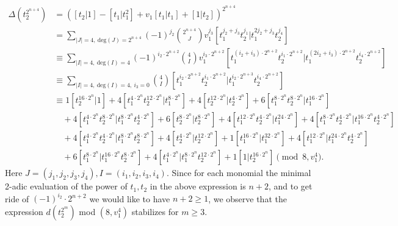 \begin{exm}
{\footnotesize
\begin{align*}
  \Delta (t_2^{2^{n+4}}) &= \left( [t_2|1] - [t_1|t_1^2] + v_1 [t_1|t_1] + [1|t_2] \right)^{2^{n+4}} \\
                         &= \sum_{|J| = 4,\ \mathrm{deg}(J) = 2^{n+4}} (-1)^{j_2} \binom{2^{n+4}}{ J } v_1^{j_3} [ t_1^{j_2 + j_3} t_2^{j_1} | t_1^{2j_2 + j_3} t_2^{j_4} ] \\
                         &\equiv  \sum_{|I|=4,\ \mathrm{deg}(I) = 4} (-1)^{i_2 \cdot 2^{n+2}} \binom{4}{I} v_1^{i_3 \cdot 2^{n+2}} [ t_1^{(i_2 + i_3) \cdot 2^{n+2}} t_2^{i_1 \cdot 2^{n+2}} | t_1^{(2i_2 + i_3) \cdot 2^{n+2}} t_2^{i_4 \cdot 2^{n+2}} ] \\
                         &\equiv  \sum_{|I|=4,\ \mathrm{deg}(I) = 4,\ i_3=0} \binom{4}{I} [ t_1^{i_2 \cdot 2^{n+2}} t_2^{i_1 \cdot 2^{n+2}} | t_1^{i_2 \cdot 2^{n+3}} t_2^{i_4 \cdot 2^{n+2}} ] \\
                         &\equiv 1 [t_2^{16 \cdot 2^{n}}|1] + 4 [t_1^{4 \cdot 2^{n}}t_2^{12 \cdot 2^{n}}| t_1^{8 \cdot 2^{n}}] + 4 [t_2^{12 \cdot 2^{n}} | t_2^{4 \cdot 2^{n}}] + 6 [t_1^{8 \cdot 2^{n}}t_2^{8 \cdot 2^{n}}| t_1^{16 \cdot 2^{n}}] \\
                         &\quad+ 4 [t_1^{4 \cdot 2^{n}}t_2^{8\cdot 2^{n}} | t_1^{8 \cdot 2^{n}} t_2^{4 \cdot 2^{n}}] + 6 [t_2^{8 \cdot 2^{n}} | t_2^{8 \cdot 2^{n}}] + 4 [t_1^{12 \cdot 2^{n}}t_2^{4 \cdot 2^{n}}| t_1^{24 \cdot 2^{n}}] + 4 [t_1^{8 \cdot 2^{n}}t_2^{4 \cdot 2^{n}} | t_1^{16 \cdot 2^{n}} t_2^{4 \cdot 2^{n}}] \\
                         &\quad+ 4 [t_1^{4 \cdot 2^{n}}t_2^{4 \cdot 2^{n}} | t_1^{8 \cdot 2^{n}} t_2^{8 \cdot 2^{n}}] + 4 [t_2^{4 \cdot 2^{n}} | t_2^{12 \cdot 2^{n}}] + 1 [t_1^{16 \cdot 2^{n}}| t_1^{32 \cdot 2^{n}}] + 4 [t_1^{12 \cdot 2^{n}}| t_1^{24 \cdot 2^{n}} t_2^{4 \cdot 2^{n}}] \\
                         &\quad+ 6 [t_1^{8 \cdot 2^{n}}| t_1^{16 \cdot 2^{n}} t_2^{8 \cdot 2^{n}}] + 4 [t_1^{4 \cdot 2^{n}}| t_1^{8 \cdot 2^{n}} t_2^{12 \cdot 2^{n}}] + 1 [1| t_2^{16 \cdot 2^{n}}] \pmod{8,v_1^4}.
\end{align*}}
Here $J=(j_1,j_2,j_3,j_4), I = (i_1,i_2,i_3,i_4)$. Since for each monomial the minimal 2-adic evaluation of the power of $t_1, t_2$ in the above expression is $n+2$, and to get ride of $(-1)^{i_2}\cdot 2^{n+2}$ we would like to have $n+2\geq 1$, we observe that the expression $d(t_2^{2^m})$ mod $(8, v_1^4)$ stabilizes for $m \geq 3$.
\end{exm}



